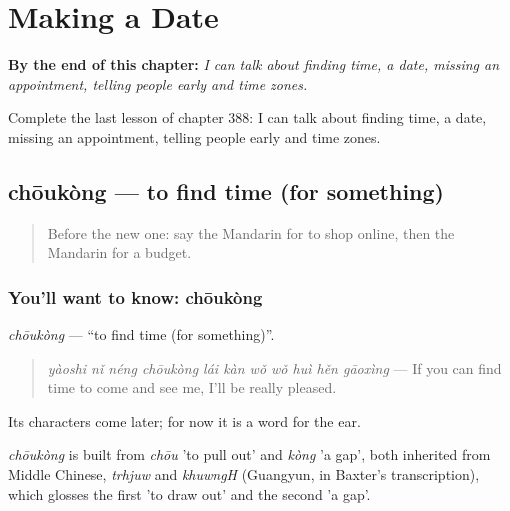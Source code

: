
\chapter{Making a Date}
\label{ch:zh-making-a-date}

\begin{chapteropening}
\textbf{By the end of this chapter:} \emph{I can talk about finding time, a date, missing an appointment, telling people early and time zones.}

Complete the last lesson of chapter 388: I can talk about finding time, a date, missing an appointment, telling people early and time zones.
\end{chapteropening}

\section[chōukòng]{chōukòng — to find time (for something)}

\label{lesson:ZH-C388-choukong}



\begin{quote}
Before the new one: say the Mandarin for to shop online, then the Mandarin for a budget.
\end{quote}

\subsection*{You'll want to know: chōukòng}
\emph{chōukòng} — \textquotedblleft{}to find time (for something)\textquotedblright{}.

\begin{quote}
\emph{yàoshi nǐ néng chōukòng lái kàn wǒ wǒ huì hěn gāoxìng} — If you can find time to come and see me, I'll be really pleased.
\end{quote}

Its characters come later; for now it is a word for the ear.

\begin{cousinweb}
\emph{chōukòng} is built from \emph{chōu} 'to pull out' and \emph{kòng} 'a gap', both inherited from Middle Chinese, \emph{trhjuw} and \emph{khuwngH} (Guangyun, in Baxter's transcription), which glosses the first 'to draw out' and the second 'a gap'.
\end{cousinweb}

